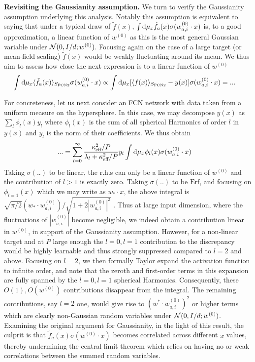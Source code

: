 {\bf Revisiting the Gaussianity assumption.} We turn to verify the Gaussianity assumption underlying this analysis. Notably this assumption is equivalent to saying that under a typical draw of $\tilde{f}(x)$, $\int \text{d} \mu_x \tilde{f}_a(x) \sigma({w}^{(0)}_{a,i} \cdot {x})$ is, to a good approximation, a linear function of ${w}^{(0)}$ as this is the most general Gaussian variable under ${\cal N}(0,I/d;w^{(0)})$. Focusing again on the case of a large target (or mean-field scaling) $\tilde{f}(x)$ would be weakly fluctuating around its mean. We thus aim to  assess how close the next expression is to a linear function of $w^{(0)}$
\begin{align}
\int \text{d}\mu_x \langle \tilde{f}_a(x)\rangle_{S_{\text{FCN2}}} \sigma({w}^{(0)}_{a,i} \cdot {x}) &\propto \int \text{d}\mu_x [\langle f(x) \rangle_{S_{\text{FCN2}}} - y(x)] \sigma({w}^{(0)}_{a,i} \cdot {x}) =... 
\end{align}

For concreteness, let us next consider an FCN network with data taken from a uniform measure on the hypersphere. In this case, we may decompose $y(x)$ as $\sum_l \phi_l(x) y_l$ where $\phi_l(x)$ is the sum of all spherical Harmonics of order $l$ in $y(x)$ and $y_l$ is the norm of their coefficients. We thus obtain  
\begin{align}
... &= \sum_{l=0}^{\infty} \frac{\kappa^2_{\text{eff}}/P}{\lambda_l + \kappa^2_{\text{eff}}/P} y_l \int \text{d}\mu_x \phi_l(x) \sigma({w}^{(0)}_{a,i} \cdot {x})
\end{align}
Taking $\sigma(..)$ to be linear, the r.h.s can only be a linear function of ${w}^{(0)}$ and the contribution of $l>1$ is exactly zero. Taking $\sigma(..)$ to be $\text{Erf}$, and focusing on $\phi_{l=1}(x)$ which we may write as ${w}_* \cdot x$, the above integral is $\sqrt{\pi/2} ({w}_* \cdot {w}_{a,i}^{(0)})/\sqrt{1+2|{w}_{a,i}^{(0)}|^2}$ \citep{rubin2024grokking}. Thus at large input dimension, where the fluctuations of $|{w}_{a,i}^{(0)}|$ become negligible, we indeed obtain a contribution linear in ${w}^{(0)}$, in support of the Gaussianity assumption. However, for a non-linear target and at $P$ large enough the $l=0,l=1$ contribution to the discrepancy would be highly learnable and thus strongly suppressed compared to $l=2$ and above. Focusing on $l=2$, we then formally Taylor expand the activation function to infinite order, and note that the zeroth and first-order terms in this expansion are fully spanned by the $l=0,l=1$ spherical Harmonics. Consequently, these $O(1),O(w^{(0)})$ contributions disappear from the integral. The remaining contributions, say $l=2$ one, would give rise to $(w^* \cdot w^{(0)}_{a,i})^2$ or higher terms \citep{rubin2024grokking} which are clearly non-Gaussian random variables under ${\cal N}(0,I/d;w^{(0)})$. Examining the original argument for Gaussianity, in the light of this result, the culprit is that $\tilde{f}_a(x)\sigma({w}^{(0)} \cdot x)$ becomes correlated across different $x$ values, thereby undermining the central limit theorem which relies on having no or weak correlations between the summed random variables.  

